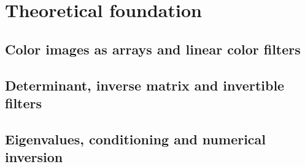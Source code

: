 \section{Theoretical foundation}\label{sec:theory}

\subsection{Color images as arrays and linear color filters}\label{sec:theory-filters}

\subsection{Determinant, inverse matrix and invertible filters}\label{sec:theory-inverse}

\subsection{Eigenvalues, conditioning and numerical inversion}\label{sec:theory-cond}

